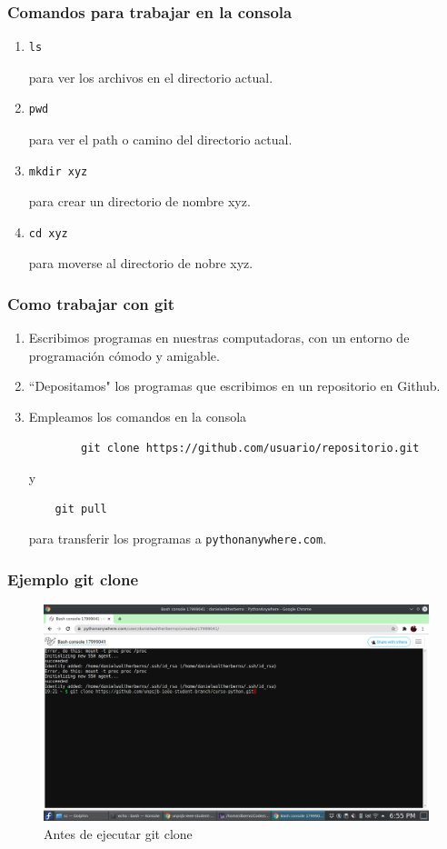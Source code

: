 \documentclass[11pt]{beamer}
\begin{document}
\begin{frame}[fragile]
	\frametitle{Comandos para trabajar en la consola}
	
\begin{enumerate}
	\item \begin{verbatim}ls\end{verbatim} para ver los archivos en el directorio actual.
	\item \begin{verbatim}pwd\end{verbatim} para ver el path o camino del directorio actual.
	\item \begin{verbatim}mkdir xyz\end{verbatim} para crear un directorio de nombre xyz.
	\item \begin{verbatim}cd xyz\end{verbatim} para moverse al directorio de nobre xyz.
\end{enumerate}
\end{frame}

\begin{frame}[fragile]
	\frametitle{Como trabajar con git}
	
\begin{enumerate}
	\item Escribimos programas en nuestras computadoras, con un entorno de programación cómodo y amigable.
	\item ``Depositamos" los programas que escribimos en un repositorio en Github.
	\item Empleamos los comandos en la consola
	\begin{verbatim}
		git clone https://github.com/usuario/repositorio.git
	\end{verbatim}
    y
	\begin{verbatim}
	git pull
    \end{verbatim}
    para transferir los programas a \verb-pythonanywhere.com-.
	
\end{enumerate}
\end{frame}

\begin{frame}
	\frametitle{Ejemplo git clone}
	\begin{figure}
		\centering
		\includegraphics[width=0.7\linewidth]{sc/git_alpha}
		\caption{Antes de ejecutar git clone}
	\end{figure}
	
\end{frame}
\end{document}
